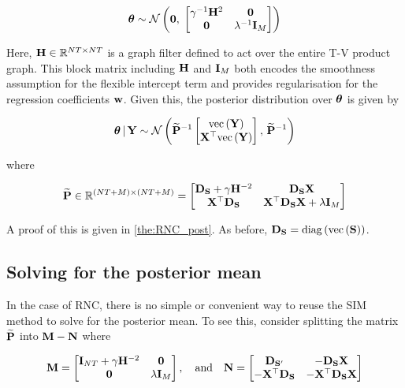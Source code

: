 \begin{equation}
    \label{eq:theta_prior}
    \boldsymbol{\theta} \sim \mathcal{N}\left( \mathbf{0}, \; \begin{bmatrix} \gamma^{-1} \mathbf{H}^2 & \mathbf{0} \\ \mathbf{0} & \lambda^{-1} \mathbf{I}_M \end{bmatrix} \right)
\end{equation}

Here, $\mathbf{H} \in \mathbb{R}^{NT \times NT}$ is a graph filter defined to act over the entire T-V product graph. This block matrix including $\mathbf{H}$ and $\mathbf{I}_M$ both encodes the smoothness assumption for the flexible intercept term and provides regularisation for the regression coefficients $\mathbf{w}$. Given this, the posterior distribution over $\boldsymbol{\theta}$ is given by 

\begin{equation}
    \boldsymbol{\theta} \, | \, \mathbf{Y} \sim \mathcal{N}\left(\widetilde{\mathbf{P}}^{-1} \begin{bmatrix} \text{\textup{vec}}\left(\mathbf{Y}\right) \\ \mathbf{X}^\top \text{\textup{vec}}\left(\mathbf{Y}\right) \end{bmatrix}, \, \widetilde{\mathbf{P}}^{-1}\right)
\end{equation}

where 

\begin{equation}
    \widetilde{\mathbf{P}} \in \mathbb{R}^{(NT + M) \times (NT + M)}= 
    \begin{bmatrix}
     \mathbf{D}_{\mathbf{S}} + \gamma \mathbf{H}^{-2} & \mathbf{D}_{\mathbf{S}}  \mathbf{X} \\
     \mathbf{X}^\top \mathbf{D}_{\mathbf{S}} & \mathbf{X}^\top \mathbf{D}_{\mathbf{S}} \mathbf{X} + \lambda \mathbf{I}_M   
    \end{bmatrix}
\end{equation}


A proof of this is given in \cref{the:RNC_post}. As before, $\mathbf{D}_{\mathbf{S}} = \text{\textup{diag}}\left(\text{\textup{vec}}\left(\mathbf{S}\right)\right)$. 
    
\subsection{Solving for the posterior mean}

\label{sec:RNC_solving}

In the case of RNC, there is no simple or convenient way to reuse the SIM method to solve for the posterior mean. To see this, consider splitting the matrix $\widetilde{\mathbf{P}}$ into $\mathbf{M} - \mathbf{N}$ where 

\begin{equation*}
    \mathbf{M} = 
    \begin{bmatrix}
        \mathbf{I}_{NT} + \gamma \mathbf{H}^{-2} & \mathbf{0} \\
        \mathbf{0} & \lambda \mathbf{I}_M   
       \end{bmatrix}, 
       \quad \text{and} \quad \mathbf{N} = \begin{bmatrix}
        \mathbf{D}_{\mathbf{S}'} & -\mathbf{D}_{\mathbf{S}}  \mathbf{X} \\
        -\mathbf{X}^\top \mathbf{D}_{\mathbf{S}} & -\mathbf{X}^\top\mathbf{D}_{\mathbf{S}} \mathbf{X} 
       \end{bmatrix}
\end{equation*}

